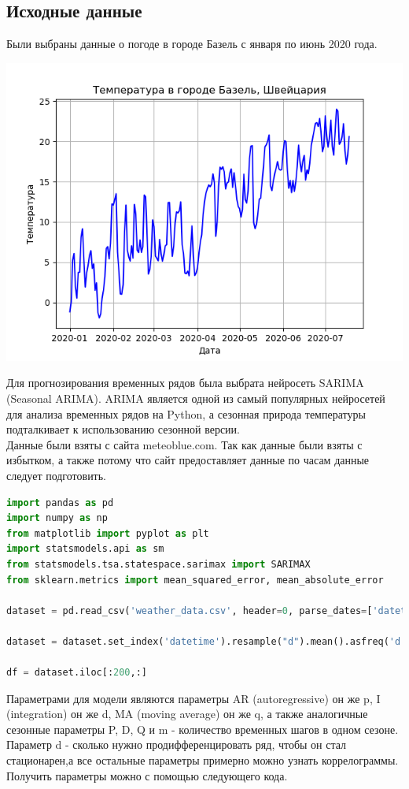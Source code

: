 \documentclass[a4paper, 12pt]{article}
\begin{document}
\subsection{Исходные данные}
Были выбраны данные о погоде в городе Базель с января по июнь 2020 года.
\begin{center}
  \centering
  \includegraphics[width=.7\linewidth]{extra/temperature.png}
  \label{fig:prplot}
\end{center}
Для прогнозирования временных рядов была выбрата нейросеть SARIMA (Seasonal ARIMA). ARIMA является одной из самый популярных нейросетей для анализа временных рядов на Python, а сезонная природа температуры подталкивает к использованию сезонной версии.\\
Данные были взяты с сайта meteoblue.com. Так как данные были взяты с избытком, а также потому что сайт предоставляет данные по часам данные следует подготовить.
\begin{lstlisting}[language=Python, caption=Подготовка данных]
import pandas as pd
import numpy as np
from matplotlib import pyplot as plt
import statsmodels.api as sm
from statsmodels.tsa.statespace.sarimax import SARIMAX
from sklearn.metrics import mean_squared_error, mean_absolute_error

dataset = pd.read_csv('weather_data.csv', header=0, parse_dates=['datetime'])

dataset = dataset.set_index('datetime').resample("d").mean().asfreq('d')

df = dataset.iloc[:200,:]
\end{lstlisting}
Параметрами для модели являются параметры AR (autoregressive) он же p, I (integration) он же d, MA (moving average) он же q, а также аналогичные сезонные параметры P, D, Q и m - количество временных шагов в одном сезоне. Параметр d - сколько нужно продифференцировать ряд, чтобы он стал стационарен,а все остальные параметры примерно можно узнать коррелограммы. Получить параметры можно с помощью следующего кода.
\end{document}
